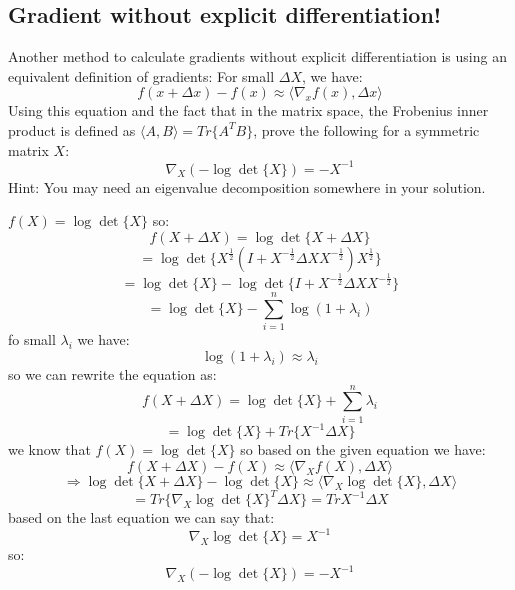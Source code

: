 \subsection{Gradient without explicit differentiation!}
Another method to calculate gradients without explicit differentiation is using an equivalent
definition of gradients:
For small $\Delta X $, we have:
$$f(x + \Delta x) - f(x) \approx \langle \nabla_x f(x) , \Delta x\rangle $$
Using this equation and the fact that in the matrix space, the Frobenius inner product is defined
as $\langle A, B \rangle = Tr\{A^T B\}$, prove the following for a symmetric matrix $X$:
$$\nabla_X(-\log \det \{X\}) = -X^{-1}$$
Hint: You may need an eigenvalue decomposition somewhere in your solution.
\begin{qsolve}
	\begin{qsolve}[]
		$f(X) = \log \det \{X\}$ so:
		$$f(X + \Delta X) = \log \det \{X + \Delta X\}$$
		$$ = \log \det \{X^{\frac{1}{2}}(I + X^{-\frac{1}{2}}\Delta X X^{-\frac{1}{2}})X^{\frac{1}{2}}\}$$
		$$ = \log \det \{X\} - \log \det \{I + X^{-\frac{1}{2}}\Delta X X^{-\frac{1}{2}}\}$$
		$$ = \log \det \{X\} - \sum_{i=1}^{n} \log(1 + \lambda_i)$$
		fo small $\lambda_i$ we have:
		$$\log(1 + \lambda_i) \approx \lambda_i$$
		so we can rewrite the equation as:
		$$f(X + \Delta X) = \log \det \{X\} + \sum_{i=1}^{n} \lambda_i$$
		$$ = \log \det \{X\} + Tr\{X^{-1}\Delta X\}$$
		we know that $f(X) = \log \det \{X\}$ so based on the given equation we have:
		$$f(X + \Delta X) - f(X) \approx \langle \nabla_X f(X) , \Delta X\rangle $$
		$$ \Rightarrow \log \det \{X + \Delta X\} - \log \det \{X\} \approx \langle \nabla_X \log \det \{X\} , \Delta X\rangle $$
		$$ = Tr{\{\nabla_X \log \det \{X\}^T \Delta X\}} = Tr{X^{-1}\Delta X}$$
		based on the last equation we can say that:
		$$\nabla_X \log \det \{X\} = X^{-1}$$
		so:
		$$\nabla_X(-\log \det \{X\}) = -X^{-1}$$
	\end{qsolve}
\end{qsolve}
